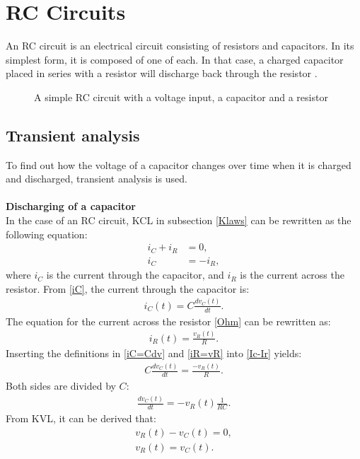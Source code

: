 \chapter{RC Circuits} \label{chap:RC}
An RC circuit is an electrical circuit consisting of resistors and capacitors. In its simplest form, it is composed of one of each. In that case, a charged capacitor placed in series with a resistor will discharge back through the resistor \cite[p~21]{artof}. 

\begin{figure}[H]
 
 \caption{A simple RC circuit with a voltage input, a capacitor and a resistor}
\end{figure}
\section{Transient analysis}
\label{sec371}
To find out how the voltage of a capacitor changes over time when it is charged and discharged, transient analysis is used.
\\
\\
\noindent\textbf{Discharging of a capacitor}\\
In the case of an RC circuit, KCL in subsection \ref{Klaws} can be rewritten as the following equation:
\begin{align}
i_{C}+i_{R}&=0, \nonumber \\
i_{C}&= -i_{R}, \label{Ic-Ir}
\end{align}
where $i_C$ is the current through the capacitor, and $i_R$ is the current across the resistor. From \eqref{iC}, the current through the capacitor is:
\begin{align}
	i_C(t) = C\frac{dv_C(t)}{dt}.\label{iC=Cdv}
\end{align}
The equation for the current across the resistor \eqref{Ohm} can be rewritten as:
\begin{align}
	i_R(t) = \frac{v_R(t)}{R}. \label{iR=vR}
\end{align}
Inserting the definitions in \eqref{iC=Cdv} and \eqref{iR=vR} into \eqref{Ic-Ir} yields:
\begin{align*}
	C\frac{dv_C(t)}{dt} = \frac{-v_R(t)}{R}.
\end{align*}
Both sides are divided by $C$:
\begin{align}
	\frac{dv_C(t)}{dt} =-v_R(t) \frac{1}{RC}.
	\label{eq:dvC(t)}
\end{align}
From KVL, it can be derived that:
\begin{align}
	v_R(t) - v_C(t) = 0, \nonumber\\
	v_R(t) = v_C(t). \label{vR(t)}
\end{align}
